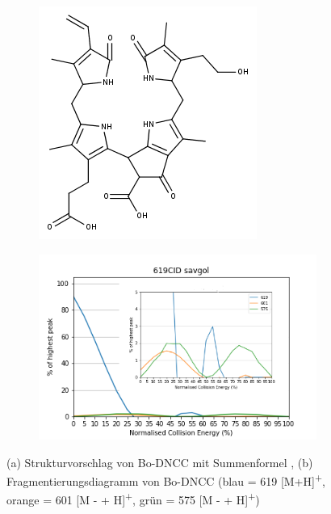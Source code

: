 \begin{figure}[!htbp]
  \begin{subfigure}[b]{0.4\textwidth}
    \includegraphics[width=\textwidth]{figures/Kapitel4/Kataboliten/fragmentation_structures/VWA_Katabolit_619.png}
    \caption{}
    \label{fig:619MKLeafspraystructure}
  \end{subfigure}
  \hfill
  \begin{subfigure}[b]{0.7\textwidth}
    \includegraphics[width=\textwidth]{figures/Kapitel4/Kataboliten/diags/619CID-savgol.png}
    \caption{}
    \label{fig:619MKLeafspraydiags}
  \end{subfigure}
  \caption[Strukturvorschlag von Bo-DNCC mit Fragmentierungsdiagramm, Quelle: Autor]{(a) Strukturvorschlag von Bo-DNCC mit Summenformel , (b) Fragmentierungsdiagramm von Bo-DNCC (blau = 619 [M+H]\textsuperscript{+}, orange = 601 [M -  + H]\textsuperscript{+}, grün = 575 [M -  + H]\textsuperscript{+})}
\end{figure}

